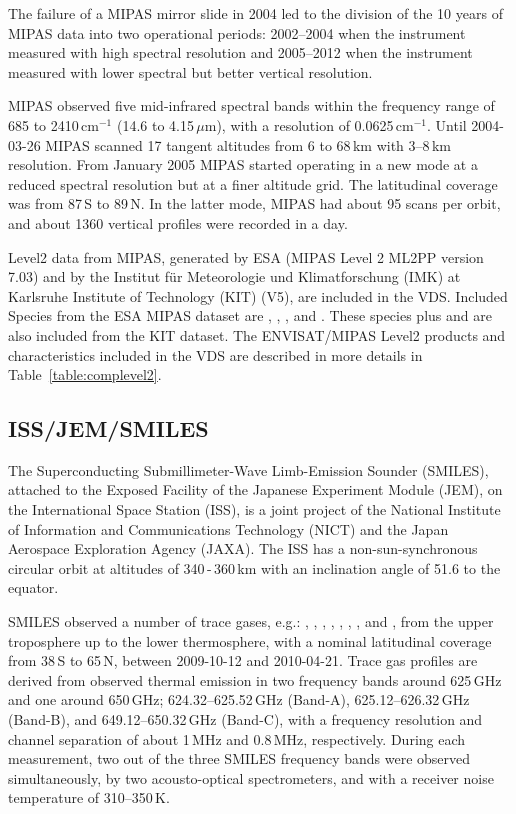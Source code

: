 The failure of a MIPAS mirror slide in 2004 led to the 
division of the 10 years of MIPAS
data into two operational periods: 2002--2004 when the 
instrument measured with high spectral resolution 
and 2005--2012 when the instrument measured with lower 
spectral but better vertical resolution.

MIPAS observed five mid-infrared spectral bands within the
frequency range of 685 to 2410\,cm\(^{-1}\) (14.6 to 4.15\,\(\mu\)m),
with a resolution of 0.0625\,cm\(^{-1}\).
Until 2004-03-26 MIPAS scanned 17 tangent altitudes from 
6 to 68\,km with 3--8\,km resolution.
From January 2005 MIPAS started operating in a new mode
at a reduced spectral resolution but at a finer altitude
grid. The latitudinal coverage was from 87\degree\,S to 89\degree\,N.
In the latter mode, MIPAS had about 95 scans per orbit, and about
1360 vertical profiles were recorded in a day.

Level2 data from MIPAS, generated by ESA
(MIPAS Level 2 ML2PP version 7.03)
and by the Institut f\"ur Meteorologie und Klimatforschung
(IMK) at Karlsruhe Institute of Technology (KIT) (V5), are
included in the VDS.
Included Species from the ESA MIPAS dataset are
, , , and .
These species plus  and  are also included from the KIT
dataset. The ENVISAT/MIPAS Level2 products and characteristics included in the
VDS are described in more details in Table~\ref{table:complevel2}.


\subsection{ISS/JEM/SMILES}

The Superconducting Submillimeter-Wave Limb-Emission Sounder (SMILES),
attached to the Exposed Facility of the Japanese Experiment Module (JEM), 
on the International Space Station (ISS), is a joint project of the
National Institute of Information and Communications Technology (NICT) and
the Japan Aerospace Exploration Agency (JAXA).
The ISS has a non-sun-synchronous circular orbit at
altitudes of 340\,-\,360\,km with an inclination angle of 51.6\degree
to the equator. 

SMILES observed a number of trace gases, e.g.: , , 
, , , , , and , 
from the upper troposphere up to the lower thermosphere,  
with a nominal latitudinal coverage 
from 38\degree\,S to 65\degree\,N, between 2009-10-12 and 2010-04-21.
Trace gas profiles are derived from observed thermal emission in two frequency
bands around 625\,GHz and one around 650\,GHz;
624.32--625.52\,GHz (Band-A), 625.12--626.32\,GHz (Band-B),
and 649.12--650.32\,GHz (Band-C), with a frequency resolution
and channel separation of about 1\,MHz and 0.8\,MHz, 
respectively.  
During each measurement, two out of the three SMILES frequency
bands were observed simultaneously, by two acousto-optical spectrometers,
and with a receiver noise temperature of 310--350\,K.

